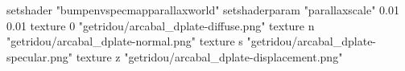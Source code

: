 setshader "bumpenvspecmapparallaxworld"
setshaderparam "parallaxscale" 0.01 0.01
texture 0 "getridou/arcabal_dplate-diffuse.png"
texture n "getridou/arcabal_dplate-normal.png"
texture s "getridou/arcabal_dplate-specular.png"
texture z "getridou/arcabal_dplate-displacement.png"